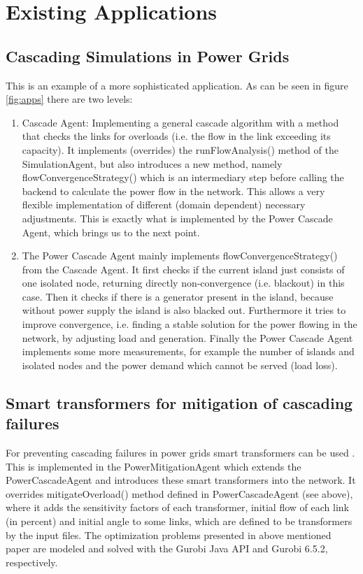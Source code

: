 \documentclass[11pt,fleqn]{book} %
\newcommand{\CascadeAgent}{CascadeAgent}
\newcommand{\backend}[1][]{backend#1}
\newcommand{\domain}[1][]{domain#1}
\begin{document}
\section{Existing Applications}\label{sec:existing_apps}

\subsection{Cascading Simulations in Power Grids}\index{Agent!Power\CascadeAgent{}}
This is an example of a more sophisticated application. As can be seen in figure \ref{fig:apps} there are two levels:
\begin{enumerate}
	\item Cascade Agent: Implementing a general cascade algorithm with a method that checks the links for overloads (i.e. the flow in the link exceeding its capacity). It implements (overrides) the runFlowAnalysis() method of the SimulationAgent, but also introduces a new method, namely flowConvergenceStrategy() which is an intermediary step before calling the \backend{} to calculate the power flow in the network. This allows a very flexible implementation of different (\domain{} dependent) necessary adjustments. This is exactly what is implemented by the Power Cascade Agent, which brings us to the next point.
	\item The Power Cascade Agent mainly implements flowConvergenceStrategy() from the Cascade Agent. It first checks if the current island just consists of one isolated node, returning directly non-convergence (i.e. blackout) in this case. Then it checks if there is a generator present in the island, because without power supply the island is also blacked out. Furthermore it tries to improve convergence, i.e. finding a stable solution for the power flowing in the network, by adjusting load and generation. Finally the Power Cascade Agent implements some more measurements, for example the number of islands and isolated nodes and the power demand which cannot be served (load loss).
\end{enumerate}

\subsection{Smart transformers for mitigation of cascading failures}
For preventing cascading failures in power grids smart transformers can be used . This is implemented in the PowerMitigationAgent which extends the PowerCascadeAgent and introduces these smart transformers into the network. It overrides mitigateOverload() method defined in PowerCascadeAgent (see above), where it adds the sensitivity factors of each transformer, initial flow of each link (in percent) and initial angle to some links, which are defined to be transformers by the input files. The optimization problems presented in above mentioned paper are modeled and solved with the Gurobi Java API and Gurobi 6.5.2, respectively. 
\end{document}
